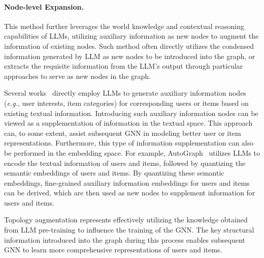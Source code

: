 \paragraph{Node-level Expansion.} 
This method further leverages the world knowledge and contextual reasoning capabilities of LLMs, utilizing auxiliary information as new nodes to augment the information of existing nodes. Such method often directly utilizes the condensed information generated by LLM as new nodes to be introduced into the graph, or extracts the requisite information from the LLM’s output through particular approaches to serve as new nodes in the graph.

Several works~\cite{jeon2024topic,hu2024bridging} directly employ LLMs to generate auxiliary information nodes (\textit{e.g.}, user interests, item categories) for corresponding users or items based on existing textual information. Introducing  such auxiliary information nodes can be viewed as a supplementation of information in the textual space. This approach can, to some extent, assist subsequent GNN in modeling better user or item representations. Furthermore, this type of information supplementation can also be performed in the embedding space. For example, AutoGraph~\cite{shan2024automatic} utilizes LLMs to encode the textual information of users and items, followed by quantizing the semantic embeddings of users and items. By quantizing these semantic embeddings, fine-grained auxiliary information embeddings for users and items can be derived, which are then used as new nodes to supplement information for users and items.

Topology augmentation represents effectively utilizing the knowledge obtained from LLM pre-training to influence the training of the GNN. The key structural information introduced into the graph during this process enables subsequent GNN to learn more comprehensive representations of users and items.

